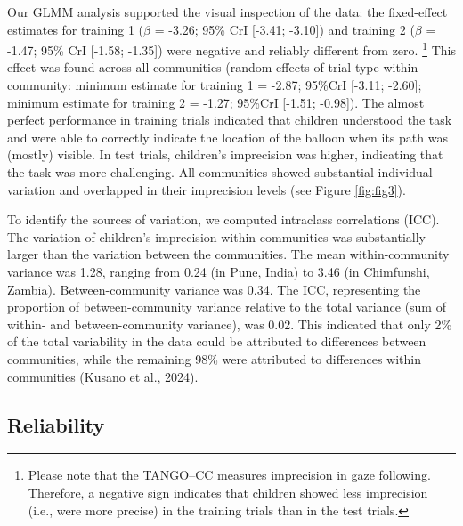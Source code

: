 \documentclass[
  man,floatsintext]{apa7}
\begin{document}
Our GLMM analysis supported the visual inspection of the data: the fixed-effect estimates for training 1 (\(\beta\) = -3.26; 95\% CrI {[}-3.41; -3.10{]}) and training 2 (\(\beta\) = -1.47; 95\% CrI {[}-1.58; -1.35{]}) were negative and reliably different from zero. \footnote{Please note that the TANGO--CC measures imprecision in gaze following.
  Therefore, a negative sign indicates that children showed less imprecision (i.e., were more precise) in the training trials than in the test trials.}
This effect was found across all communities (random effects of trial type within community: minimum estimate for training 1 = -2.87; 95\%CrI {[}-3.11; -2.60{]}; minimum estimate for training 2 = -1.27; 95\%CrI {[}-1.51; -0.98{]}).
The almost perfect performance in training trials indicated that children understood the task and were able to correctly indicate the location of the balloon when its path was (mostly) visible.
In test trials, children's imprecision was higher, indicating that the task was more challenging.
All communities showed substantial individual variation and overlapped in their imprecision levels (see Figure \ref{fig:fig3}).

To identify the sources of variation, we computed intraclass correlations (ICC).
The variation of children's imprecision within communities was substantially larger than the variation between the communities.
The mean within-community variance was 1.28, ranging from 0.24 (in Pune, India) to 3.46 (in Chimfunshi, Zambia).
Between-community variance was 0.34.
The ICC, representing the proportion of between-community variance relative to the total variance (sum of within- and between-community variance), was 0.02.
This indicated that only 2\% of the total variability in the data could be attributed to differences between communities, while the remaining 98\% were attributed to differences within communities (Kusano et al., 2024).

\subsection{Reliability}\label{reliability}
\end{document}
